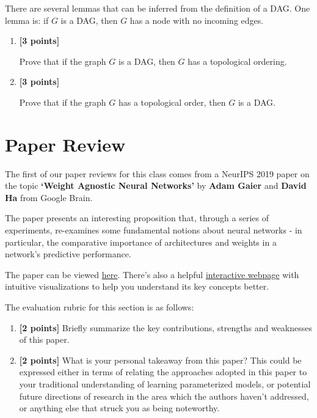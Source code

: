 \documentclass[11pt,english]{article}
\begin{document}
There are several lemmas that can be inferred from the definition of a DAG. One lemma is: if $G$ is a DAG, then $G$ has a node with no incoming edges.   


\begin{enumerate}[resume]

\item
\textbf{[3 points]}

Prove that if the graph $G$ is a DAG, then $G$ has a topological ordering.

\item
\textbf{[3 points]}

Prove that if the graph $G$ has a topological order, then $G$ is a DAG.

\end{enumerate}

\section{Paper Review}


The first of our paper reviews for this class comes from a NeurIPS 2019 paper on the topic \textbf{`Weight Agnostic Neural Networks'} by \textbf{Adam Gaier} and \textbf{David Ha} from Google Brain.

The paper presents an interesting proposition that, through a series of experiments, re-examines some fundamental notions about neural networks - in particular, the comparative importance of architectures and weights in a network's predictive performance. 

The paper can be viewed \href{https://arxiv.org/abs/1906.04358}{here}.
There's also a helpful \href{https://weightagnostic.github.io/}{interactive webpage} with intuitive visualizations to help you understand its key concepts better. 

The evaluation rubric for this section is as follows:

\begin{enumerate}[resume]
\item
\textbf{[2 points]}
Briefly summarize the key contributions, strengths and weaknesses of this paper.

\item
\textbf{[2 points]}
What is your personal takeaway from this paper? This could be expressed either in terms of relating the approaches adopted in this paper to your traditional understanding of learning parameterized models, or potential future directions of research in the area which the authors haven't addressed, or anything else that struck you as being noteworthy. 
\end{enumerate}
\end{document}
